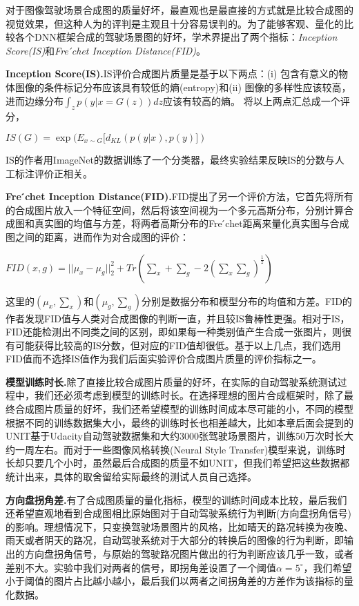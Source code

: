 对于图像驾驶场景合成图的质量好坏，最直观也是最直接的方式就是比较合成图的视觉效果，但这种人为的评判是主观且十分容易误判的。为了能够客观、量化的比较各个DNN框架合成的驾驶场景图的好坏，学术界提出了两个指标：\textit{Inception Score(IS)}\cite{IS}和\textit{Fre ́chet Inception Distance(FID)}\cite{FID}。

\textbf{Inception Score(IS).\cite{IS}}\quad IS评价合成图片质量是基于以下两点：(i) 包含有意义的物体图像的条件标记分布应该具有较低的熵(entropy)和(ii) 图像的多样性应该较高，进而边缘分布$\int_z p(y|x=G(z))dz$应该有较高的熵。
将以上两点汇总成一个评分，
\begin{center}
    $IS(G)=\exp{(E_{x\sim G}[d_{KL}(p(y|x), p(y)])}$
\end{center}
IS的作者用ImageNet\cite{ImageNet}的数据训练了一个分类器，最终实验结果反映IS的分数与人工标注评价正相关。

\textbf{Fre ́chet Inception Distance(FID).\cite{FID}}\quad FID提出了另一个评价方法，它首先将所有的合成图片放入一个特征空间，然后将该空间视为一个多元高斯分布，分别计算合成图和真实图的均值与方差，将两者高斯分布的Fre ́chet距离来量化真实图与合成图之间的距离，进而作为对合成图的评价：
\begin{center}
    $FID(x,g)=||\mu_x-\mu_g||_2^2+Tr(\sum_x + \sum_g - 2(\sum_x\sum_g)^{\frac{1}{2}})$
\end{center}
这里的$(\mu_x,\sum_x)$和$(\mu_g,\sum_g)$分别是数据分布和模型分布的均值和方差。FID的作者发现FID值与人类对合成图像的判断一直，并且较IS\cite{IS}鲁棒性更强。相对于IS，FID还能检测出不同类之间的区别，即如果每一种类别值产生合成一张图片，则很有可能获得比较高的IS分数，但对应的FID值却很低。基于以上几点，我们选用FID值而不选择IS值作为我们后面实验评价合成图片质量的评价指标之一。

\textbf{模型训练时长.}\quad 除了直接比较合成图片质量的好坏，在实际的自动驾驶系统测试过程中，我们还必须考虑到模型的训练时长。在选择理想的图片合成框架时，除了最终合成图片质量的好坏，我们还希望模型的训练时间成本尽可能的小，不同的模型根据不同的训练数据集大小，最终的训练时长也相差越大，比如本章后面会提到的UNIT\cite{UNIT}基于Udacity自动驾驶数据集\cite{udacity_dataset}和大约3000张驾驶场景图片，训练50万次时长大约一周左右。而对于一些图像风格转换(Neural Style Transfer)模型来说，训练时长却只要几个小时，虽然最后合成图的质量不如UNIT，但我们希望把这些数据都统计出来，具体的取舍留给实际最终的测试人员自己选择。 

\textbf{方向盘拐角差.}\quad 有了合成图质量的量化指标，模型的训练时间成本比较，最后我们还希望直观地看到合成图相比原始图对于自动驾驶系统行为判断(方向盘拐角信号)的影响。理想情况下，只变换驾驶场景图片的风格，比如晴天的路况转换为夜晚、雨天或者阴天的路况，自动驾驶系统对于大部分的转换后的图像的行为判断，即输出的方向盘拐角信号，与原始的驾驶路况图片做出的行为判断应该几乎一致，或者差别不大。实验中我们对两者的信号，即拐角差设置了一个阈值$\alpha=5^{\circ}$，我们希望小于阈值的图片占比越小越小，最后我们以两者之间拐角差的方差作为该指标的量化数据。

